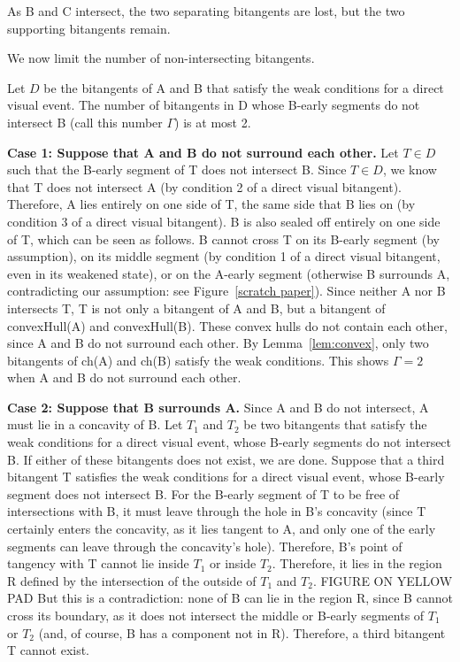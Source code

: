 \documentclass[12pt]{article}
\begin{document}
As B and C intersect, the two separating bitangents are lost,
but the two supporting bitangents remain.
\QED

We now limit the number of non-intersecting bitangents.

\begin{lemma}
\label{lem:atmost2}
Let $D$ be the bitangents of A and B that satisfy the weak conditions for a direct 
visual event.
The number of bitangents in D whose B-early segments do not intersect B 
(call this number $\Gamma$)
is at most 2.
\end{lemma}
\prf
{\bf Case 1: Suppose that A and B do not surround each other.}
Let $T \in D$ such that the B-early segment of T does not intersect B.
Since $T \in D$, we know that T does not intersect A (by condition 2 of a direct visual bitangent).
Therefore, A lies entirely on one side of T, the same side that B lies on (by condition 3
of a direct visual bitangent).
B is also sealed off entirely on one side of T, which can be seen as follows.
B cannot cross T on its B-early segment (by assumption),
on its middle segment (by condition 1 of a direct visual bitangent, 
even in its weakened state), or
on the A-early segment (otherwise B surrounds A, contradicting our assumption: 
see Figure~\ref{scratch paper}).
Since neither A nor B intersects T,
T is not only a bitangent of A and B, but a bitangent of convexHull(A) and convexHull(B).
These convex hulls do not contain each other, since A and B do not surround each other.
By Lemma~\ref{lem:convex}, only two bitangents of ch(A) and ch(B) 
satisfy the weak conditions.
This shows $\Gamma = 2$ when A and B do not surround each other.


{\bf Case 2: Suppose that B surrounds A.}
Since A and B do not intersect, A must lie in a concavity of B.
Let $T_1$ and $T_2$ be two bitangents that satisfy the weak conditions
for a direct visual event, whose B-early segments do not intersect B.
If either of these bitangents does not exist, we are done.
Suppose that a third bitangent T satisfies the weak conditions for a direct visual event,
whose B-early segment does not intersect B.
For the B-early segment of T to be free of intersections with B, it must
leave through the hole in B's concavity (since T certainly enters the concavity, as 
it lies tangent to A, and only one of the early segments can leave through the concavity's
hole).
Therefore, B's point of tangency with T cannot lie inside $T_1$ or inside $T_2$.
Therefore, it lies in the region R defined by the intersection of the 
outside of $T_1$ and $T_2$.
%
FIGURE ON YELLOW PAD
%
But this is a contradiction: none of B can lie in the region R, 
since B cannot cross its boundary, as it does not intersect
the middle or B-early segments of $T_1$ or $T_2$ (and, of course, B has a component
not in R).
Therefore, a third bitangent T cannot exist.
\end{document}
